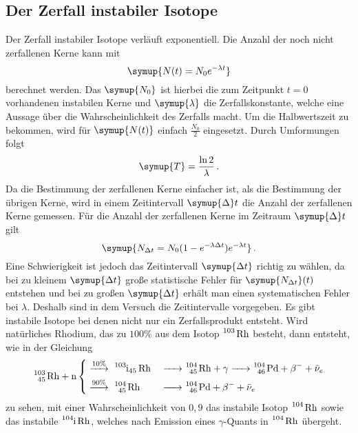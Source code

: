 \subsection{Der Zerfall instabiler Isotope}
Der Zerfall instabiler Isotope verläuft exponentiell. Die Anzahl der noch nicht zerfallenen Kerne kann mit 
\begin{equation}
    \symup{N(t)=N_0 e^{- \lambda t}}
    \label{eqn:isotope}
\end{equation}
berechnet werden. Das $\symup{N_0}$ ist hierbei die zum Zeitpunkt $t=0$ vorhandenen instabilen Kerne und $\symup{\lambda}$ die Zerfallskonstante, welche eine Aussage über die Wahrscheinlichkeit des Zerfalls macht.
Um die Halbwertszeit zu bekommen, wird für $\symup{N(t)}$ einfach $\frac{N_0}{2}$ eingesetzt. Durch Umformungen folgt
\begin{equation}
    \symup{T}=\frac{\ln{2}}{\lambda} \, .
    \label{eqn:halbw}
\end{equation}
Da die Bestimmung der zerfallenen Kerne einfacher ist, als die Bestimmung der übrigen Kerne, wird in einem Zeitintervall $\symup{\Delta}t$
die Anzahl der zerfallenen Kerne gemessen. Für die Anzahl der zerfallenen Kerne im Zeitraum $\symup{\Delta}t$ gilt
\begin{equation}
    \symup{N_{\Delta t}=N_0(1-e^{-\lambda \Delta t})e^{-\lambda t}} \, .
\end{equation}
Eine Schwierigkeit ist jedoch das Zeitintervall $\symup{\Delta t}$ richtig zu wählen, da
bei zu kleinem $\symup{\Delta t}$ große statistische Fehler für $\symup{N_{\Delta t}}(t)$ entstehen 
und bei zu großen $\symup{\Delta t}$ erhält man einen systematischen Fehler bei $\lambda$. 
Deshalb sind in dem Versuch die Zeitintervalle vorgegeben. 
Es gibt instabile Isotope bei denen nicht nur ein Zerfallsprodukt entsteht.
Wird natürliches Rhodium, das zu $100\%$ aus dem Isotop $\ce{^103 Rh}$ besteht, dann entsteht, wie in der Gleichung
\begin{equation}
   \ce{^103_45 Rh + n } 
    \begin{dcases}
        \stackrel{10\%}{\ce{->}}\ce{ ^103i_45 Rh &-> ^104_45 Rh + $\gamma$ -> ^104_46 Pd + $\beta$- + $\bar{\nu}_e$}  \\
        \stackrel{90\%}{\ce{->}}\ce{ ^104_45 Rh  &-> ^104_46 Pd + $\beta$- + $\bar{\nu}_e$} 
    \end{dcases}
\end{equation}
zu sehen, mit einer Wahrscheinlichkeit von $0,9$ das instabile Isotop $\ce{^104 Rh}$ sowie das instabile $\ce{^104i Rh}$, welches nach Emission eines $\gamma$-Quants in $\ce{^104 Rh}$ übergeht.
